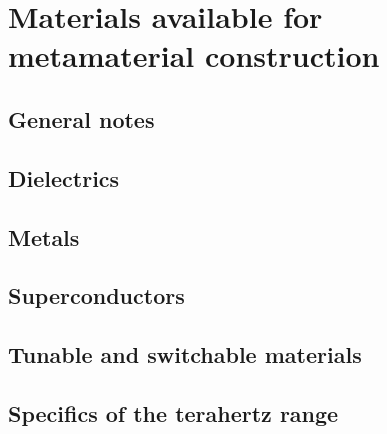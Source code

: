 




\section{Materials available for metamaterial construction}
\subsection{General notes}
\subsection{Dielectrics}
\subsection{Metals}
\subsection{Superconductors}
\subsection{Tunable and switchable materials}
\subsection{Specifics of the terahertz range}




